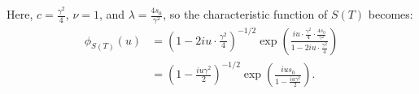 Here, $c = \frac{\gamma^2}{4}$, $\nu = 1$, and $\lambda = \frac{4 s_0}{\gamma^2}$, so the characteristic function of $S(T)$ becomes:
\begin{align*}
    \phi_{S(T)}(u)
    &= \left(1 - 2i u \cdot \frac{\gamma^2}{4} \right)^{-1/2}
    \exp\left( \frac{i u \cdot \frac{\gamma^2}{4} \cdot \frac{4 s_0}{\gamma^2}}{1 - 2i u \cdot \frac{\gamma^2}{4}} \right) \\
    &= \left(1 - \frac{i u \gamma^2}{2} \right)^{-1/2}
    \exp\left( \frac{i u s_0}{1 - \frac{i u \gamma^2}{2}} \right).
\end{align*}
